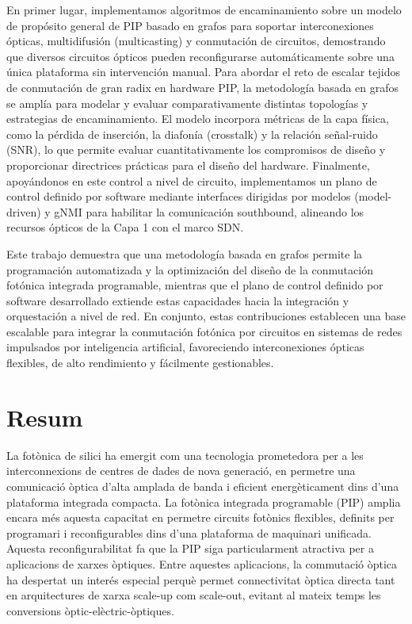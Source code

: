 En primer lugar, implementamos algoritmos de encaminamiento sobre un modelo de propósito general de PIP basado en grafos para soportar interconexiones ópticas, multidifusión (multicasting) y conmutación de circuitos, demostrando que diversos circuitos ópticos pueden reconfigurarse automáticamente sobre una única plataforma sin intervención manual.
Para abordar el reto de escalar tejidos de conmutación de gran radix en hardware PIP, la metodología basada en grafos se amplía para modelar y evaluar comparativamente distintas topologías y estrategias de encaminamiento.
El modelo incorpora métricas de la capa física, como la pérdida de inserción, la diafonía (crosstalk) y la relación señal-ruido (SNR), lo que permite evaluar cuantitativamente los compromisos de diseño y proporcionar directrices prácticas para el diseño del hardware.
Finalmente, apoyándonos en este control a nivel de circuito, implementamos un plano de control definido por software mediante interfaces dirigidas por modelos (model-driven) y gNMI para habilitar la comunicación southbound, alineando los recursos ópticos de la Capa 1 con el marco SDN.

Este trabajo demuestra que una metodología basada en grafos permite la programación automatizada y la optimización del diseño de la conmutación fotónica integrada programable, mientras que el plano de control definido por software desarrollado extiende estas capacidades hacia la integración y orquestación a nivel de red.
En conjunto, estas contribuciones establecen una base escalable para integrar la conmutación fotónica por circuitos en sistemas de redes impulsados por inteligencia artificial, favoreciendo interconexiones ópticas flexibles, de alto rendimiento y fácilmente gestionables.

\chapter*{Resum}
La fotònica de silici ha emergit com una tecnologia prometedora per a les interconnexions de centres de dades de nova generació, en permetre una comunicació òptica d'alta amplada de banda i eficient energèticament dins d'una plataforma integrada compacta.
La fotònica integrada programable (PIP) amplia encara més aquesta capacitat en permetre circuits fotònics flexibles, definits per programari i reconfigurables dins d'una plataforma de maquinari unificada.
Aquesta reconfigurabilitat fa que la PIP siga particularment atractiva per a aplicacions de xarxes òptiques.
Entre aquestes aplicacions, la commutació òptica ha despertat un interés especial perquè permet connectivitat òptica directa tant en arquitectures de xarxa scale-up com scale-out, evitant al mateix temps les conversions òptic-elèctric-òptiques.

